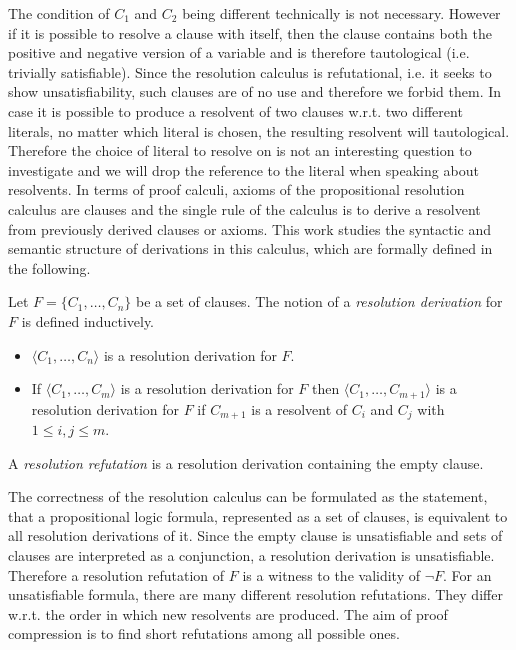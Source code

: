 The condition of $C_1$ and $C_2$ being different technically is not necessary.
However if it is possible to resolve a clause with itself, then the clause contains both the positive and negative version of a variable and is therefore tautological (i.e. trivially satisfiable).
Since the resolution calculus is refutational, i.e. it seeks to show unsatisfiability, such clauses are of no use and therefore we forbid them.
In case it is possible to produce a resolvent of two clauses w.r.t. two different literals, no matter which literal is chosen, the resulting resolvent will tautological.
Therefore the choice of literal to resolve on is not an interesting question to investigate and we will drop the reference to the literal when speaking about resolvents.
In terms of proof calculi, axioms of the propositional resolution calculus are clauses and the single rule of the calculus is to derive a resolvent from previously derived clauses or axioms.
This work studies the syntactic and semantic structure of derivations in this calculus, which are formally defined in the following.

\begin{definition}

Let $F = \{C_1, \ldots, C_n\}$ be a set of clauses.
The notion of a \emph{resolution derivation} for $F$ is defined inductively.
\begin{itemize}
	\item $\langle C_1, \ldots, C_n\rangle$ is a resolution derivation for $F$.
	\item If $\langle C_1, \ldots, C_m\rangle$ is a resolution derivation for $F$ then $\langle C_1, \ldots, C_{m+1} \rangle$ is a resolution derivation for $F$ if $C_{m+1}$ is a resolvent of $C_i$ and $C_j$ with $1 \leq i,j \leq m$.
\end{itemize}
A \emph{resolution refutation} is a resolution derivation containing the empty clause.

\end{definition}

The correctness of the resolution calculus can be formulated as the statement, that a propositional logic formula, represented as a set of clauses, is equivalent to all resolution derivations of it. 
Since the empty clause is unsatisfiable and sets of clauses are interpreted as a conjunction, a resolution derivation is unsatisfiable.
Therefore a resolution refutation of $F$ is a witness to the validity of $\neg F$.
For an unsatisfiable formula, there are many different resolution refutations.
They differ w.r.t. the order in which new resolvents are produced.
The aim of proof compression is to find short refutations among all possible ones.

